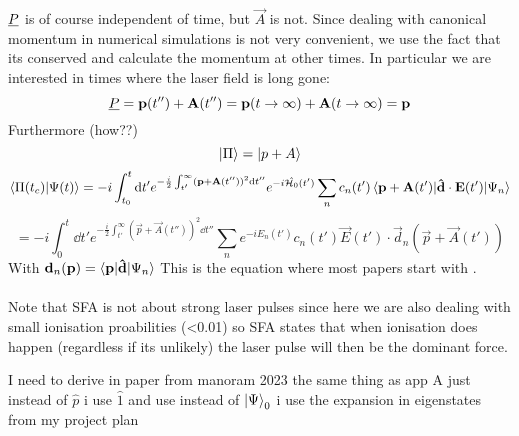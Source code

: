 $\underline{P}$ is of course independent of time, but $\vec{A}$ is not. 
Since dealing with canonical momentum in numerical simulations is not very convenient, we use the fact that its conserved and calculate the momentum at other times.
In particular we are interested in times where the laser field is long gone:
\begin{equation*}
    \underline{P} = \mathbf{p}(t'') + \mathbf{A}(t'') = \mathbf{p}(t\rightarrow \infty) + \mathbf{A}(t\rightarrow \infty) = \mathbf{p}
\end{equation*}
Furthermore (how??)
\begin{equation*}
    \ket{\Pi} = \ket{p+A}
\end{equation*}
\begin{equation}
    \braket{\Pi(t_c)|\Psi(t)} = -i \int_{t_0}^{t} \mathrm{d} t' e^{-\frac{i}{2}\int_{t'}^{\infty}(\mathbf{p}+\mathbf{A}(t''))^2\mathrm{d} t''}e^{-i \hat{\mathcal{H}_0} (t')} \sum_{n}c_n(t')\braket{\mathbf{p}+\mathbf{A}(t')|\mathbf{\hat{d}}\cdot\mathbf{E}(t')|\Psi_n}
\end{equation}
\begin{equation*}
    = -i \int_{0}^{t} \dd t' e^{-\frac{i}{2}\int_{t'}^{\infty}(\vec{p}+\vec{A}(t''))^2\dd t''} \sum_{n}e^{-iE_n(t')}c_n(t')\vec{E}(t')\cdot\vec{d}_n(\vec{p}+\vec{A}(t'))
\end{equation*}
With $\mathbf{d}_n(\mathbf{p}) = \braket{\mathbf{p}|\mathbf{\hat{d}}|\Psi_n}$
This is the equation where most papers start with \cite{Theory_NPS}.\\\\
Note that SFA is not about strong laser pulses since here we are also dealing with small ionisation proabilities (<0.01) so SFA states that when ionisation does happen (regardless if its unlikely) the laser pulse will then be the dominant force.


I need to derive in paper from manoram 2023 the same thing as app A just instead of $\hat{p}$ i use $\hat{1}$ and use instead of $\ket{\Psi}_0$ i use the expansion in eigenstates from my project plan


\newpage
